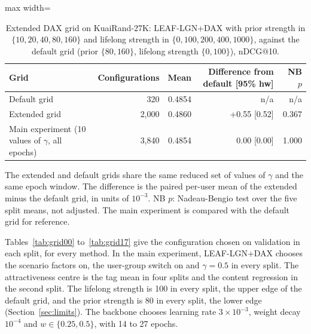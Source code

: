 \documentclass[preprint,12pt,authoryear]{elsarticle}
\begin{document}
\begin{table}[tbp]
\centering
\footnotesize
\caption{Extended DAX grid on KuaiRand-27K: LEAF-LGN+DAX with prior strength in $\{10,20,40,80,160\}$ and lifelong strength in $\{0,100,200,400,1000\}$, against the default grid (prior $\{80,160\}$, lifelong strength $\{0,100\}$), nDCG@10.}
\label{tab:extgrid}
\begin{adjustbox}{max width=\linewidth}
\begin{tabular}{lrrrr}
\toprule
Grid & Configurations & Mean & Difference from default [95\% hw] & NB $p$ \\
\midrule
Default grid & 320 & 0.4854 & n/a & n/a \\
Extended grid & 2,000 & 0.4860 & +0.55 [0.52] & 0.367 \\
Main experiment (10 values of $\gamma$, all epochs) & 3,840 & 0.4854 & 0.00 [0.00] & 1.000 \\
\bottomrule
\end{tabular}
\end{adjustbox}
\par\smallskip
\begin{minipage}{\linewidth}\raggedright\footnotesize The extended and default grids share the same reduced set of values of $\gamma$ and the same epoch window. The difference is the paired per-user mean of the extended minus the default grid, in units of $10^{-3}$. NB $p$: Nadeau-Bengio test over the five split means, not adjusted. The main experiment is compared with the default grid for reference.\end{minipage}
\end{table}


Tables~\ref{tab:grid00} to~\ref{tab:grid17} give the configuration chosen on validation in each split, for every method. In the main experiment,
LEAF-LGN+DAX chooses the scenario factors on, the user-group switch on and $\gamma=0.5$ in every split. The attractiveness centre is the tag mean in four
splits and the content regression in the second split. The lifelong strength is 100 in every split, the upper edge of the default grid, and the prior
strength is 80 in every split, the lower edge (Section~\ref{sec:limits}). The backbone chooses learning rate $3\times10^{-3}$, weight decay $10^{-4}$ and
$w\in\{0.25,0.5\}$, with 14 to 27 epochs.
\end{document}
